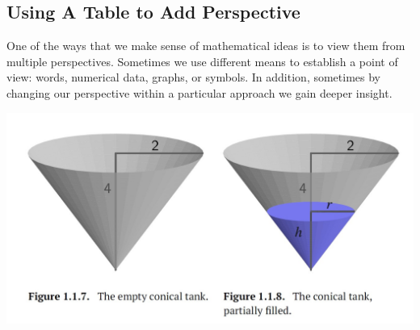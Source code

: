 \documentclass{ximera}
\begin{document}
\begin{tcolorbox}[colback=yellow!15, breakable,pad at break*=1mm]
\begin{example}
\begin{enumerate}[label=\alph*.]
\end{enumerate}
\end{example}
\end{tcolorbox}



\subsection{Using A Table to Add Perspective}

One of the ways that we make sense of mathematical ideas is to view them from multiple perspectives.  Sometimes we use different means to establish a point of view:  words, numerical data, graphs, or symbols.  In addition, sometimes by changing our perspective within a particular approach we gain deeper insight.%

\includegraphics[width=\textwidth]{APCfigure1.1.7.jpg}
\end{document}
